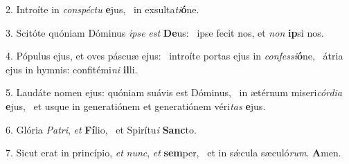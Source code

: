 2. Introíte in \textit{con}\textit{spéc}\textit{tu} \textbf{e}jus, \ast\  in exsulta\textit{ti}\textbf{ó}ne.\

3. Scitóte quóniam Dóminus \textit{ip}\textit{se} \textit{est} \textbf{De}us: \ast\  ipse fecit nos, et \textit{non} \textbf{ip}si nos.\

4. Pópulus ejus, et oves páscuæ ejus: \dag\  introíte portas ejus in \textit{con}\textit{fes}\textit{si}\textbf{ó}ne, \ast\  átria ejus in hymnis: confitémi\textit{ni} \textbf{il}li.\

5. Laudáte nomen ejus: quóniam suávis est Dóminus, \dag\  in ætérnum miseri\textit{cór}\textit{di}\textit{a} \textbf{e}jus, \ast\  et usque in generatiónem et generatiónem véri\textit{tas} \textbf{e}jus.\

6. Glória \textit{Pa}\textit{tri}, \textit{et} \textbf{Fí}lio, \ast\  et Spirítu\textit{i} \textbf{Sanc}to.\

7. Sicut erat in princípio, \textit{et} \textit{nunc}, \textit{et} \textbf{sem}per, \ast\  et in sǽcula sæculó\textit{rum}. \textbf{A}men.\


